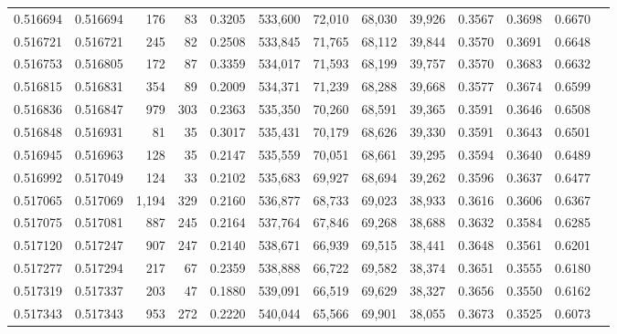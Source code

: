\begin{tabular}{rrrrrrrrrrrrr}
0.516694 & 0.516694 &   176 &    83 &                                     0.3205 & 533,600 &  72,010 &  68,030 &  39,926 & 0.3567 & 0.3698 & 0.6670 \\
0.516721 & 0.516721 &   245 &    82 &                                     0.2508 & 533,845 &  71,765 &  68,112 &  39,844 & 0.3570 & 0.3691 & 0.6648 \\
0.516753 & 0.516805 &   172 &    87 &                                     0.3359 & 534,017 &  71,593 &  68,199 &  39,757 & 0.3570 & 0.3683 & 0.6632 \\
0.516815 & 0.516831 &   354 &    89 &                                     0.2009 & 534,371 &  71,239 &  68,288 &  39,668 & 0.3577 & 0.3674 & 0.6599 \\
0.516836 & 0.516847 &   979 &   303 &                                     0.2363 & 535,350 &  70,260 &  68,591 &  39,365 & 0.3591 & 0.3646 & 0.6508 \\
0.516848 & 0.516931 &    81 &    35 &                                     0.3017 & 535,431 &  70,179 &  68,626 &  39,330 & 0.3591 & 0.3643 & 0.6501 \\
0.516945 & 0.516963 &   128 &    35 &                                     0.2147 & 535,559 &  70,051 &  68,661 &  39,295 & 0.3594 & 0.3640 & 0.6489 \\
0.516992 & 0.517049 &   124 &    33 &                                     0.2102 & 535,683 &  69,927 &  68,694 &  39,262 & 0.3596 & 0.3637 & 0.6477 \\
0.517065 & 0.517069 & 1,194 &   329 &                                     0.2160 & 536,877 &  68,733 &  69,023 &  38,933 & 0.3616 & 0.3606 & 0.6367 \\
0.517075 & 0.517081 &   887 &   245 &                                     0.2164 & 537,764 &  67,846 &  69,268 &  38,688 & 0.3632 & 0.3584 & 0.6285 \\
0.517120 & 0.517247 &   907 &   247 &                                     0.2140 & 538,671 &  66,939 &  69,515 &  38,441 & 0.3648 & 0.3561 & 0.6201 \\
0.517277 & 0.517294 &   217 &    67 &                                     0.2359 & 538,888 &  66,722 &  69,582 &  38,374 & 0.3651 & 0.3555 & 0.6180 \\
0.517319 & 0.517337 &   203 &    47 &                                     0.1880 & 539,091 &  66,519 &  69,629 &  38,327 & 0.3656 & 0.3550 & 0.6162 \\
0.517343 & 0.517343 &   953 &   272 &                                     0.2220 & 540,044 &  65,566 &  69,901 &  38,055 & 0.3673 & 0.3525 & 0.6073 \\

\end{tabular}
